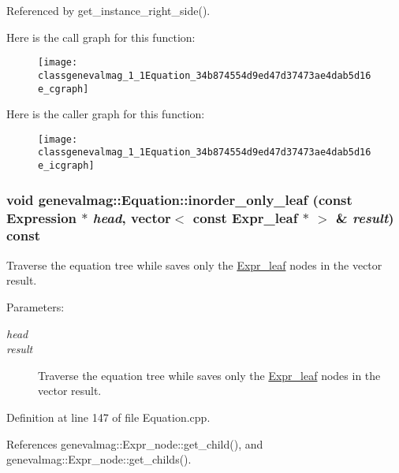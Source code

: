 Referenced by get\_\-instance\_\-right\_\-side().

Here is the call graph for this function:\nopagebreak
\begin{figure}[H]
\begin{center}
\leavevmode
\texttt{[image: classgenevalmag\_1\_1Equation\_34b874554d9ed47d37473ae4dab5d16e\_cgraph]}
\end{center}
\end{figure}


Here is the caller graph for this function:\nopagebreak
\begin{figure}[H]
\begin{center}
\leavevmode
\texttt{[image: classgenevalmag\_1\_1Equation\_34b874554d9ed47d37473ae4dab5d16e\_icgraph]}
\end{center}
\end{figure}
\hypertarget{classgenevalmag_1_1Equation_bcc00948998a3828cd1f107afda796b1}{
\subsubsection[{inorder\_\-only\_\-leaf}]{\setlength{\rightskip}{0pt plus 5cm}void genevalmag::Equation::inorder\_\-only\_\-leaf (const {\bf Expression} $\ast$ {\em head}, \/  vector$<$ const {\bf Expr\_\-leaf} $\ast$ $>$ \& {\em result}) const}}
\label{classgenevalmag_1_1Equation_bcc00948998a3828cd1f107afda796b1}


Traverse the equation tree while saves only the \hyperlink{classgenevalmag_1_1Expr__leaf}{Expr\_\-leaf} nodes in the vector result. \begin{Desc}
\item[Parameters:]
\begin{description}
\item[{\em head}]\item[{\em result}]Traverse the equation tree while saves only the \hyperlink{classgenevalmag_1_1Expr__leaf}{Expr\_\-leaf} nodes in the vector result. \end{description}
\end{Desc}


Definition at line 147 of file Equation.cpp.

References genevalmag::Expr\_\-node::get\_\-child(), and genevalmag::Expr\_\-node::get\_\-childs().

